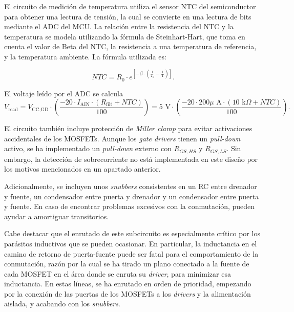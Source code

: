 El circuito de medición de temperatura utiliza el sensor NTC del semiconductor para obtener una lectura de tensión, la cual se convierte en una lectura de bits mediante el ADC del MCU. La relación entre la resistencia del NTC y la temperatura se modela utilizando la fórmula de Steinhart-Hart, que toma en cuenta el valor de Beta del NTC, la resistencia a una temperatura de referencia, y la temperatura ambiente. La fórmula utilizada es:

\[
NTC = R_0 \cdot e^{\left[-\beta \cdot \left(\frac{1}{T_0} - \frac{1}{\text{T}}\right)\right]} \text{.}
\]

El voltaje leído por el ADC se calcula
\[
V_{\text{read}} = V_{\text{CC,GD}} \cdot \left(\frac{-20 \cdot I_{\text{AIN}} \cdot (R_{\text{filt}} + NTC)}{100}\right) = 5 \text{ V} \cdot \left(\frac{-20 \cdot 200 \mu\text{ A} \cdot (10 \text{ k}\Omega + NTC)}{100}\right) \text{.}
\]

El circuito también incluye protección de \textit{Miller clamp} para evitar activaciones accidentales de los MOSFETs. Aunque los \textit{gate drivers} tienen un \textit{pull-down} activo, se ha implementado un \textit{pull-down} externo con $R_{GS,HS}$ y $R_{GS,LS}$. Sin embargo, la detección de sobrecorriente no está implementada en este diseño por los motivos mencionados en un apartado anterior.

Adicionalmente, se incluyen unos \textit{snubbers} consistentes en un RC entre drenador y fuente, un condensador entre puerta y drenador y un condensador entre puerta y fuente. En caso de encontrar problemas excesivos con la conmutación, pueden ayudar a amortiguar transitorios.

Cabe destacar que el enrutado de este subcircuito es especialmente crítico por los parásitos inductivos que se pueden ocasionar. En particular, la inductancia en el camino de retorno de puerta-fuente puede ser fatal para el comportamiento de la conmutación, razón por la cual se ha tirado un plano conectado a la fuente de cada MOSFET en el área donde se enruta su \textit{driver}, para minimizar esa inductancia. En estas líneas, se ha enrutado en orden de prioridad, empezando por la conexión de las puertas de los MOSFETs a los \textit{drivers} y la alimentación aislada, y acabando con los \textit{snubbers}.

